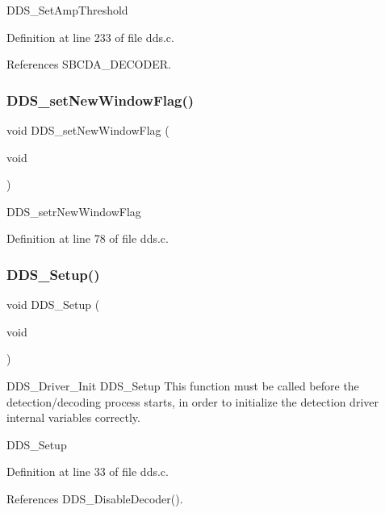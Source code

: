 D\+D\+S\+\_\+\+Set\+Amp\+Threshold 

Definition at line 233 of file dds.\+c.



References S\+B\+C\+D\+A\+\_\+\+D\+E\+C\+O\+D\+ER.

\mbox{\label{group___d_d_s___a_p_i_ga010269c11a1f1c9f53f31d1521a22471}} 
\subsubsection{\texorpdfstring{D\+D\+S\+\_\+set\+New\+Window\+Flag()}{DDS\_setNewWindowFlag()}}
{\footnotesize\ttfamily void D\+D\+S\+\_\+set\+New\+Window\+Flag (\begin{DoxyParamCaption}\item[{void}]{ }\end{DoxyParamCaption})}

D\+D\+S\+\_\+setr\+New\+Window\+Flag 

Definition at line 78 of file dds.\+c.

\mbox{\label{group___d_d_s___a_p_i_ga396bdfd69860d5c88d26f7094a3cc41c}} 
\subsubsection{\texorpdfstring{D\+D\+S\+\_\+\+Setup()}{DDS\_Setup()}}
{\footnotesize\ttfamily void D\+D\+S\+\_\+\+Setup (\begin{DoxyParamCaption}\item[{void}]{ }\end{DoxyParamCaption})}

D\+D\+S\+\_\+\+Driver\+\_\+\+Init D\+D\+S\+\_\+\+Setup This function must be called before the detection/decoding process starts, in order to initialize the detection driver internal variables correctly.

D\+D\+S\+\_\+\+Setup 

Definition at line 33 of file dds.\+c.



References D\+D\+S\+\_\+\+Disable\+Decoder().

